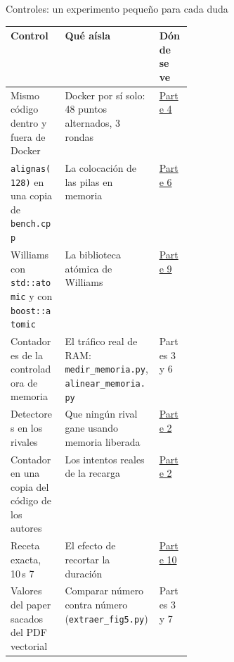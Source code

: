 \begin{frame}{Controles: un experimento pequeño para cada duda}
  \footnotesize\renewcommand{\arraystretch}{1.13}
  \begin{tabularx}{\linewidth}{@{}p{0.3\linewidth}Xl@{}}
    \toprule
    \textbf{Control} & \textbf{Qué aísla} & \textbf{Dónde se ve}\\
    \midrule
    Mismo código dentro y fuera de Docker & Docker por sí solo: 48 puntos alternados, 3 rondas & \hyperlink{parte4}{Parte 4}\\
    \texttt{alignas(128)} en una copia de \texttt{bench.cpp} & La colocación de las pilas en memoria & \hyperlink{parte6}{Parte 6}\\
    Williams con \texttt{std::atomic} y con \texttt{boost::atomic} & La biblioteca atómica de Williams & \hyperlink{parte9}{Parte 9}\\
    Contadores de la controladora de memoria & El tráfico real de RAM: \texttt{medir\_memoria.py}, \texttt{alinear\_memoria.py} & Partes 3 y 6\\
    Detectores en los rivales & Que ningún rival gane usando memoria liberada & \hyperlink{parte2}{Parte 2}\\
    Contador en una copia del código de los autores & Los intentos reales de la recarga & \hyperlink{parte2}{Parte 2}\\
    Receta exacta, 10\,s \por{} 7 & El efecto de recortar la duración & \hyperlink{parte10}{Parte 10}\\
    Valores del paper sacados del PDF vectorial & Comparar número contra número (\texttt{extraer\_fig5.py}) & Partes 3 y 7\\
    \bottomrule
  \end{tabularx}
\end{frame}

